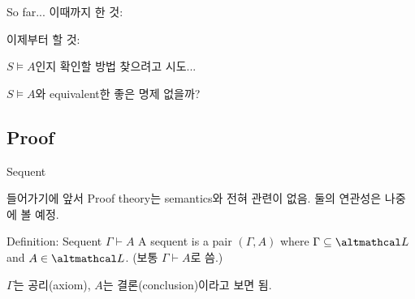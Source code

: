 \documentclass[../231120_msquare_computational-logic.tex]{subfiles}
\begin{document}
\begin{frame}{So far...}
    이때까지 한 것:
    \begin{center}
    \end{center}
    \pause
    \begin{alertblock}{}
        이제부터 할 것:
        \begin{itemize}
            \ii \(S \vDash A\)인지 확인할 방법 찾으려고 시도...
                \begin{itemize}
                    \ii \(S \vDash A\)와 equivalent한 좋은 명제 없을까?
                \end{itemize}
        \end{itemize}
    \end{alertblock}
\end{frame}

\subsection{Proof}
\begin{frame}{Sequent}
    \begin{alertblock}{들어가기에 앞서}
        Proof theory는 semantics와 전혀 관련이 없음.
        둘의 연관성은 나중에 볼 예정.
    \end{alertblock}
    \pause
    \begin{block}{Definition: Sequent \(\Gamma \vdash A\)}
        A sequent is a pair \((\Gamma, A)\) where \(\Gamma \subseteq \Lang\) and \(A \in \Lang\).
        (보통 \alert{\(\Gamma \vdash A\)}로 씀.)
    \end{block}
    \(\Gamma\)는 공리(axiom), \(A\)는 결론(conclusion)이라고 보면 됨.

\end{frame}
\end{document}
